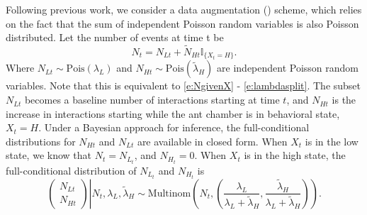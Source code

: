 \documentclass[cmbright,fleqn,referee]{envauth}
\begin{document}

Following previous work, we consider a data augmentation (\cite{Tanner1987, VanDyk2001}) scheme, which relies on the fact that the sum of independent Poisson random variables is also Poisson distributed. Let the number of events at time t be
\begin{equation}
N_t = N_{Lt} + \tilde{N}_{Ht} \mathbb{I}_{\{X_t = H\}}.
\end{equation}
Where $N_{Lt} \sim \text{Pois}(\lambda_L)$ and $N_{Ht} \sim \text{Pois}(\tilde{\lambda}_H)$ are independent Poisson random variables.
Note that this is equivalent to \eqref{e:NgivenX} - \eqref{e:lambdasplit}. The subset $N_{Lt}$ becomes a baseline number of interactions starting at time $t$, and $N_{Ht}$ is the increase in interactions starting while the ant chamber is in behavioral state, $X_t = H$. Under a Bayesian approach for inference, the full-conditional distributions for $N_{Ht}$ and $N_{Lt}$ are available in closed form. When $X_t$ is in the low state, we know that $N_t = N_{L_t}$, and $N_{H_t} = 0$. When $X_t$ is in the high state, the full-conditional distribution of $N_{L_t}$ and $N_{H_t}$ is
\begin{equation}
\left. \begin{pmatrix}
    	N_{Lt}\\
        N_{Ht}
    	\end{pmatrix} \right| N_t, \lambda_L, \tilde{\lambda}_H  \sim 
\text{Multinom}\left(N_t,  \left(\frac{\lambda_L}{\lambda_L + \tilde{\lambda}_H}, \frac{\tilde{\lambda}_H}{\lambda_L + \tilde{\lambda}_H}\right)\right).
\label{e:splitNdist}
\end{equation}
\end{document}
